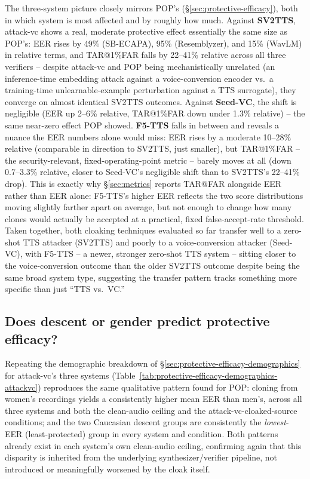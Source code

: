 \documentclass[11pt]{article}
\begin{document}
The three-system picture closely mirrors POP's
(\S\ref{sec:protective-efficacy}), both in which system is most
affected and by roughly how much. Against \textbf{SV2TTS}, attack-vc
shows a real, moderate protective effect essentially the same size as
POP's: EER rises by 49\% (SB-ECAPA), 95\% (Resemblyzer), and 15\%
(WavLM) in relative terms, and TAR@1\%FAR falls by 22--41\% relative
across all three verifiers -- despite attack-vc and POP being
mechanistically unrelated (an inference-time embedding attack against
a voice-conversion encoder vs.\ a training-time unlearnable-example
perturbation against a TTS surrogate), they converge on almost
identical SV2TTS outcomes. Against \textbf{Seed-VC}, the shift is
negligible (EER up 2--6\% relative, TAR@1\%FAR down under 1.3\%
relative) -- the same near-zero effect POP showed. \textbf{F5-TTS}
falls in between and reveals a nuance the EER numbers alone would
miss: EER rises by a moderate 10--28\% relative (comparable in
direction to SV2TTS, just smaller), but TAR@1\%FAR -- the
security-relevant, fixed-operating-point metric -- barely moves at all
(down 0.7--3.3\% relative, closer to Seed-VC's negligible shift than to
SV2TTS's 22--41\% drop). This is exactly why \S\ref{sec:metrics}
reports TAR@FAR alongside EER rather than EER alone: F5-TTS's higher
EER reflects the two score distributions moving slightly farther apart
on average, but not enough to change how many clones would actually be
accepted at a practical, fixed false-accept-rate threshold. Taken
together, both cloaking techniques evaluated so far transfer well to
a zero-shot TTS attacker (SV2TTS) and poorly to a voice-conversion
attacker (Seed-VC), with F5-TTS -- a newer, stronger zero-shot TTS
system -- sitting closer to the voice-conversion outcome than the
older SV2TTS outcome despite being the same broad system type,
suggesting the transfer pattern tracks something more specific than
just ``TTS vs.\ VC.''

\subsection{Does descent or gender predict protective efficacy?}
\label{sec:protective-efficacy-demographics-attackvc}

Repeating the demographic breakdown of
\S\ref{sec:protective-efficacy-demographics} for attack-vc's three
systems (Table~\ref{tab:protective-efficacy-demographics-attackvc})
reproduces the same qualitative pattern found for POP: cloning from
women's recordings yields a consistently higher mean EER than men's,
across all three systems and both the clean-audio ceiling and the
attack-vc-cloaked-source conditions; and the two Caucasian descent
groups are consistently the \emph{lowest}-EER (least-protected) group
in every system and condition. Both patterns already exist in each
system's own clean-audio ceiling, confirming again that this
disparity is inherited from the underlying synthesizer/verifier
pipeline, not introduced or meaningfully worsened by the cloak itself.
\end{document}
